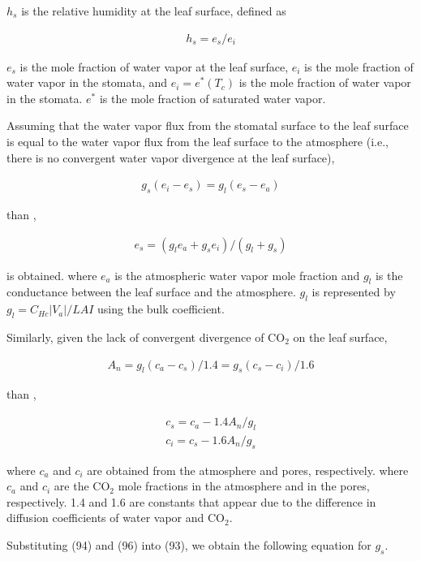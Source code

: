 \(h_s\) is the relative humidity at the leaf surface, defined as

\begin{eqnarray}
 h_s = e_s / e_i
\end{eqnarray}

\(e_s\) is the mole fraction of water vapor at the leaf surface, \(e_i\)
is the mole fraction of water vapor in the stomata, and
\(e_i = e^*(T_c)\) is the mole fraction of water vapor in the stomata.
\(e^*\) is the mole fraction of saturated water vapor.

Assuming that the water vapor flux from the stomatal surface to the leaf
surface is equal to the water vapor flux from the leaf surface to the
atmosphere (i.e., there is no convergent water vapor divergence at the
leaf surface),

\begin{eqnarray}
 g_s(e_i - e_s) = g_l(e_s - e_a)
\end{eqnarray}

than ,

\begin{eqnarray}
 e_s = ( g_l e_a + g_s e_i ) / ( g_l + g_s )
\end{eqnarray}

is obtained. where \(e_a\) is the atmospheric water vapor mole fraction
and \(g_l\) is the conductance between the leaf surface and the
atmosphere. \(g_l\) is represented by \(g_l = C_{Hc}|V_a| / LAI\) using
the bulk coefficient.

Similarly, given the lack of convergent divergence of CO\(_2\) on the
leaf surface,

\begin{eqnarray}
 A_n = g_l(c_a - c_s)/1.4
     = g_s(c_s - c_i)/1.6
\end{eqnarray}

than ,

\begin{eqnarray}
 c_s = c_a - 1.4 A_n/g_l \\
 c_i = c_s - 1.6 A_n/g_s
\end{eqnarray}

where \(c_a\) and \(c_i\) are obtained from the atmosphere and pores,
respectively. where \(c_a\) and \(c_i\) are the CO\(_2\) mole fractions
in the atmosphere and in the pores, respectively. 1.4 and 1.6 are
constants that appear due to the difference in diffusion coefficients of
water vapor and CO\(_2\).

Substituting (94) and (96) into (93), we obtain the following equation
for \(g_s\).


